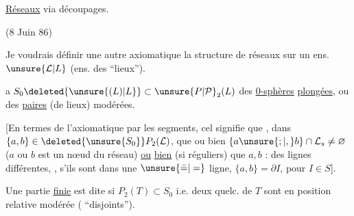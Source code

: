 
\uline{Réseaux}\unsure{\ldots} via découpages.

(8 Juin 86)



Je voudrais définir une autre axiomatique
 la structure de réseaux
sur un ens. $\unsure{\mathcal L|L}$ (ens. des ``lieux'').

\textcircled{\scriptsize a}\quad $S_0\deleted{\unsure{(L)|L}}\subset\unsure{P|\mathcal P}_2(L)$  des \uline{0-sphères}
\uline{plongées}, ou des \uline{paires}  (de
lieux) modérées. 


[En termes de
l'axiomatique par les segments,
cel signifie que  ,
 dans $\{a,b\}\in\deleted{\unsure{S_0}}P_2(\mathcal L)$, que
ou bien $\{a\unsure{;|,}b\}\cap\mathcal L_s\ne\varnothing$ ($a$ ou $b$ est un
nœud  du réseau) \uline{ou} \uline{bien} 
(si   réguliers) que $a,b$   :
des lignes différentes, , s'ils sont
dans une $\unsure{\bar{=}|=}$ ligne,  $\{a,b\}=\partial I$,
pour $I\in S$].

 Une partie \uline{finie}  est dite  
si  $P_2(T)\subset S_0$
i.e. deux  quelc. de $T$ sont en
position relative modérée (  ``disjoints'').



